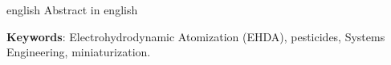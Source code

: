 \begin{resumo}[Abstract]
    \begin{otherlanguage*}{english}
      Abstract in english

      \vspace{\onelineskip}
    
      \noindent 
      \textbf{Keywords}: Electrohydrodynamic Atomization (EHDA), pesticides, Systems Engineering, miniaturization.
    \end{otherlanguage*}
   \end{resumo}
   